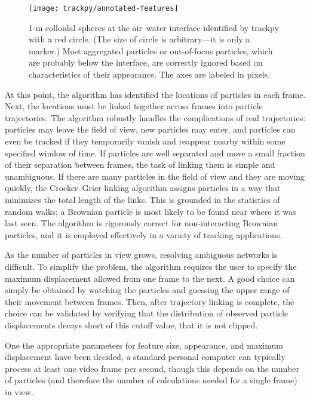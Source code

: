    \begin{figure}
    \centering
    \texttt{[image: trackpy/annotated-features]}
    \caption[1-\textmu m colloidal spheres at the air--water interface identified by trackpy with a red circle.]{\label{fig:annotated-features}1-\textmu m colloidal spheres at the air--water interface identified by trackpy with a red circle. (The size of circle is arbitrary---it is only a marker.) Most aggregated particles or out-of-focus particles, which are probably below the interface, are correctly ignored based on characteristics of their appearance. The axes are labeled in pixels.}
    \end{figure}

At this point, the algorithm has identified the locations of particles in each frame. Next, the locations must be linked together across frames into particle trajectories. The algorithm robustly handles the complications of real trajectories: particles may leave the field of view, new particles may enter, and particles can even be tracked if they temporarily vanish and reappear nearby within some specified window of time. If particles are well separated and move a small fraction of their separation between frames, the task of linking them is simple and unambiguous. If there are many particles in the field of view and they are moving quickly, the Crocker--Grier linking algorithm assigns particles in a way that minimizes the total length of the links. This is grounded in the statistics of random walks; a Brownian particle is most likely to be found near where it was last seen. The algorithm is rigorously correct for non-interacting Brownian particles\cite{Crocker1996}, and it is employed effectively in a variety of tracking applications.

As the number of particles in view grows, resolving ambiguous networks is difficult. To simplify the problem, the algorithm requires the user to specify the maximum displacement allowed from one frame to the next. A good choice can simply be obtained by watching the particles and guessing the upper range of their movement between frames. Then, after trajectory linking is complete, the choice can be validated by verifying that the distribution of observed particle displacements decays short of this cutoff value, that it is not clipped.

One the appropriate parameters for feature size, appearance, and maximum displacement have been decided, a standard personal computer can typically process at least one video frame per second, though this depends on the number of particles (and therefore the number of calculations needed for a single frame) in view.


